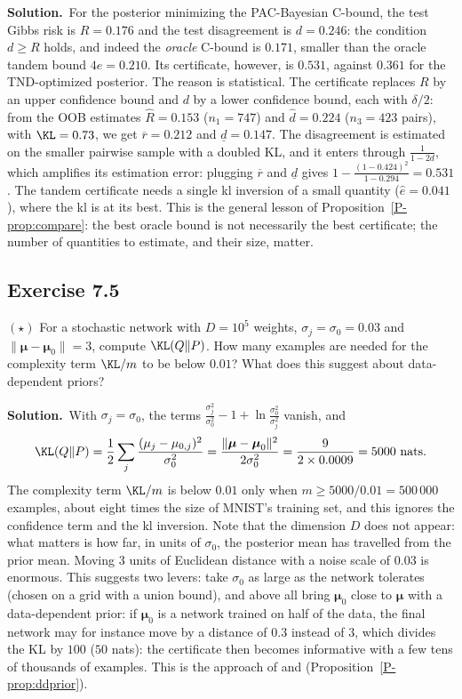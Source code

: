 \documentclass[11pt]{article}
\newcommand{\statement}[1]{\begin{tcolorbox}[enhanced,breakable,colback=black!3,colframe=black!25,boxrule=0.4pt,sharp corners,fontupper=\itshape\small]#1\end{tcolorbox}}
\newcommand{\exo}[1]{\Needspace{6\baselineskip}\subsection*{Exercise #1}\addcontentsline{toc}{subsection}{Exercise #1}}
\newcommand{\sol}{\noindent\textbf{Solution.}\ }
\begin{document}
\sol For the posterior minimizing the PAC-Bayesian C-bound, the test Gibbs risk is $R=0.176$ and the test
disagreement is $d=0.246$: the condition $d\geq R$ holds, and indeed the \emph{oracle} C-bound is $0.171$, smaller than the
oracle tandem bound $4e=0.210$. Its certificate, however, is $0.531$, against $0.361$ for the TND-optimized posterior. The
reason is statistical. The certificate replaces $R$ by an upper confidence bound and $d$ by a lower confidence bound,
each with $\delta/2$: from the OOB estimates $\hat R=0.153$ ($n_1=747$) and $\hat d=0.224$ ($n_3=423$ pairs), with $\KL=0.73$,
we get $\overline r=0.212$ and $\underline d=0.147$. The disagreement is estimated on the smaller pairwise sample with a doubled KL,
and it enters through $\frac1{1-2d}$, which amplifies its estimation error: plugging $\overline r$ and $\underline d$ gives
$1-\frac{(1-0.424)^2}{1-0.294}=0.531$. The tandem certificate needs a single kl inversion of a small quantity ($\hat e=0.041$),
where the kl is at its best. This is the general lesson of Proposition~\ref{P-prop:compare}: the best oracle bound is not
necessarily the best certificate; the number of quantities to estimate, and their size, matter.

\exo{7.5}
\statement{$(\star)$ For a stochastic network with $D=10^5$ weights, $\sigma_j=\sigma_0=0.03$ and $\|\boldsymbol\mu-\boldsymbol\mu_0\|=3$, compute
$\KL(Q\|P)$. How many examples are needed for the complexity term $\KL/m$ to be below $0.01$? What does this suggest
about data-dependent priors?}

\sol With $\sigma_j=\sigma_0$, the terms $\frac{\sigma_j^2}{\sigma_0^2}-1+\ln\frac{\sigma_0^2}{\sigma_j^2}$ vanish, and
\[
\KL(Q\|P)=\frac12\sum_j\frac{(\mu_j-\mu_{0,j})^2}{\sigma_0^2}=\frac{\|\boldsymbol\mu-\boldsymbol\mu_0\|^2}{2\sigma_0^2}=\frac{9}{2\times0.0009}=5000\text{ nats}.
\]
The complexity term $\KL/m$ is below $0.01$ only when $m\geq5000/0.01=500\,000$ examples, about eight times the size of
MNIST's training set, and this ignores the confidence term and the kl inversion. Note that the dimension $D$ does not
appear: what matters is how far, in units of $\sigma_0$, the posterior mean has travelled from the prior mean. Moving
$3$ units of Euclidean distance with a noise scale of $0.03$ is enormous. This suggests two levers: take $\sigma_0$ as large
as the network tolerates (chosen on a grid with a union bound), and above all bring $\boldsymbol\mu_0$ close to $\boldsymbol\mu$ with a
data-dependent prior: if $\boldsymbol\mu_0$ is a network trained on half of the data, the final network may for instance move by a
distance of $0.3$ instead of $3$, which divides the KL by $100$ ($50$ nats): the certificate then becomes informative
with a few tens of thousands of examples. This is the approach of \citet{dziugaite2018data} and \citet{perez2021tighter}
(Proposition~\ref{P-prop:ddprior}).



\end{document}
